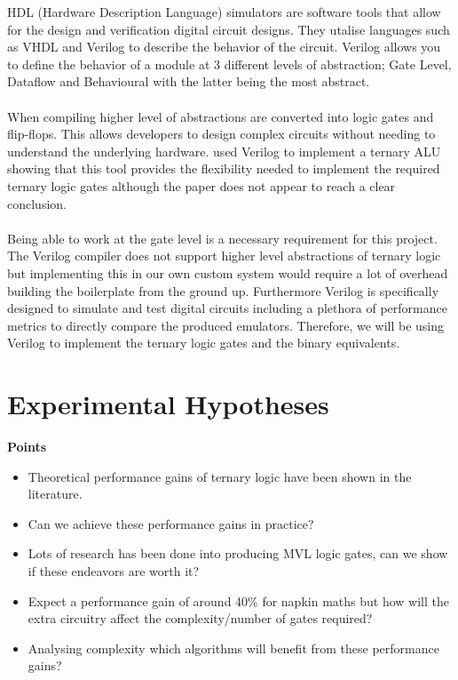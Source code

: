 \documentclass[12pt]{article}
\begin{document}
HDL (Hardware Description Language) simulators are software tools that allow for the design and verification digital circuit designs. They utalise 
languages such as VHDL and Verilog to describe the behavior of the circuit. Verilog allows you to define the behavior of a module at 3 different 
levels of abstraction; Gate Level, Dataflow and Behavioural with the latter being the most abstract.\\
\\
When compiling higher level of abstractions are converted into logic gates and flip-flops. This allows developers to design complex circuits 
without needing to understand the underlying hardware. \citep{bitra2018implementation} used Verilog to implement a ternary ALU showing that this tool provides 
the flexibility needed to implement the required ternary logic gates although the paper does not appear to reach a clear conclusion.\\
\\
Being able to work at the gate level is a necessary requirement for this project. The Verilog compiler does not support higher level 
abstractions of ternary logic but implementing this in our own custom system would require a lot of overhead building the boilerplate from the ground up. Furthermore Verilog is specifically designed to simulate and test digital circuits 
including a plethora of performance metrics to directly compare the produced emulators. Therefore, we will be using Verilog to implement the ternary logic gates and the binary
equivalents.\\

\newpage

\section{Experimental Hypotheses}

\textbf{Points}
\begin{itemize}
    \item Theoretical performance gains of ternary logic have been shown in the literature.
    \item Can we achieve these performance gains in practice?
    \item Lots of research has been done into producing MVL logic gates, can we show if these endeavors are worth it?
    \item Expect a performance gain of around 40\% for napkin maths but how will the extra circuitry affect the complexity/number of gates required?
    \item Analysing complexity which algorithms will benefit from these performance gains?
\end{itemize}
\end{document}
